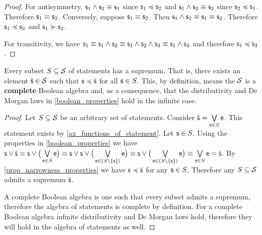 \documentclass[11pt,letterpaper,fleqn]{memoir} %
\begin{document}
\begin{mathSection}
\begin{proof}
	For antisymmetry, $\stmt_1 \AND \stmt_2 \equiv \stmt_1$ since $\stmt_1 \narrower \stmt_2$ and $\stmt_1 \AND \stmt_2 \equiv \stmt_2$ since $\stmt_2 \narrower \stmt_1$. Therefore $\stmt_1 \equiv \stmt_2$. Conversely, suppose $\stmt_1 \equiv \stmt_2$. Then $\stmt_1 \AND \stmt_2 \equiv \stmt_1 \equiv \stmt_2$. Therefore $\stmt_1 \narrower \stmt_2$ and $\stmt_1 \broader \stmt_2$.
	
	For transitivity, we have $\stmt_1 \equiv \stmt_1 \AND \stmt_2 \equiv \stmt_1 \AND \stmt_2 \AND \stmt_3 \equiv \stmt_1 \AND \stmt_3$ and therefore $\stmt_1 \narrower \stmt_3$.
\end{proof}

\begin{prop}
	Every subset $S \subseteq \logCtx$ of statements has a supremum. That is, there exists an element $\bar{\stmt} \in \logCtx$ such that $\stmt \narrower \bar{\stmt}$ for all $\stmt \in S$. This, by definition, means the $\logCtx$ is a \textbf{complete} Boolean algebra and, as a consequence, that the distributivity and De Morgan laws in \ref{boolean_properties} hold in the infinite case.
\end{prop}

\begin{proof}
	Let $S \subseteq \logCtx$ be an arbitrary set of statements. Consider $\bar{\stmt}=\bigOR\limits_{\stmt[e] \in S} \stmt[e]$. This statement exists by \ref{ax_functions_of_statement}. Let $\stmt \in S$. Using the properties in \ref{boolean_properties} we have $\stmt \OR \bar{\stmt} \equiv \stmt \OR \big(\bigOR\limits_{\stmt[e] \in S} \stmt[e] \big) \equiv \stmt \OR \stmt \OR \big(\bigOR\limits_{\stmt[e] \in (S \setminus \{\stmt\})} \stmt[e] \big) \equiv \stmt \OR \big(\bigOR\limits_{\stmt[e] \in (S \setminus \{\stmt\})} \stmt[e] \big) \equiv \bigOR\limits_{\stmt[e] \in S} \stmt[e] = \bar{\stmt}$. By \ref{prop_narrowness_properties} we have $\stmt \narrower \bar{\stmt}$ for any $\stmt \in S$. Therefore any $S \subseteq \logCtx$ admits a supremum $\bar{\stmt}$.
	
	A complete Boolean algebra is one such that every subset admits a supremum, therefore the algebra of statements is complete by definition. For a complete Boolean algebra infinite distributivity and De Morgan laws hold, therefore they will hold in the algebra of statements as well.
\end{proof}

\end{mathSection}
\end{document}
